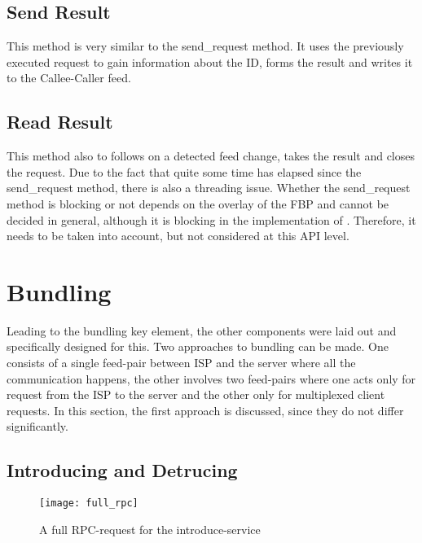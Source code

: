 \subsection{Send Result}
This method is very similar to the send\_request method. It uses the previously executed request to gain information about the ID, forms the result and writes it to the Callee-Caller feed.
\begin{python}

    
\end{python}

\subsection{Read Result}
This method also to follows on a detected feed change, takes the result and closes the request. Due to the fact that quite some time has elapsed since the send\_request method, there is also a threading issue. Whether the send\_request method is blocking or not depends on the overlay of the FBP and cannot be decided in general, although it is blocking in the implementation of \citet{birrell1984implementing}. Therefore, it needs to be taken into account, but not considered at this API level.
\begin{python}

    
\end{python}


\section{Bundling}
Leading to the bundling key element, the other components were laid out and specifically designed for this. Two approaches to bundling can be made. One consists of a single feed-pair between ISP and the server where all the communication happens, the other involves two feed-pairs where one acts only for request from the ISP to the server and the other only for multiplexed client requests. In this section, the first approach is discussed, since they do not differ significantly.
\subsection{Introducing and Detrucing}
\begin{figure}
    \centering
    \texttt{[image: full\_rpc]}
    \caption{A full RPC-request for the introduce-service}
    \label{fig:fullprc}
\end{figure}

